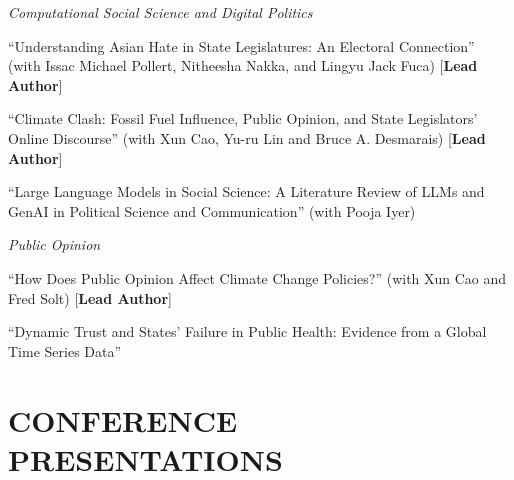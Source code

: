 \documentclass[10.5pt,]{article}
\providecommand{\tightlist}{%
	\setlength{\itemsep}{0pt}\setlength{\parskip}{0pt}}
\renewenvironment{itemize}{
	\begin{list}{}{
			\setlength{\leftmargin}{1.5em}
		}
	}{
	\end{list}
}
\begin{document}
\begin{itemize}
  \begin{itemize}
  \tightlist
  \item
    \emph{Computational Social Science and Digital Politics}
  \item
    ``Understanding Asian Hate in State Legislatures: An Electoral
    Connection'' (with Issac Michael Pollert, Nitheesha Nakka, and
    Lingyu Jack Fuca) {[}\textbf{Lead Author}{]}
  \item
    ``Climate Clash: Fossil Fuel Influence, Public Opinion, and State
    Legislators' Online Discourse'' (with Xun Cao, Yu-ru Lin and Bruce
    A. Desmarais) {[}\textbf{Lead Author}{]}
  \item
    ``Large Language Models in Social Science: A Literature Review of
    LLMs and GenAI in Political Science and Communication'' (with Pooja
    Iyer)
  \item
    \emph{Public Opinion}
  \item
    ``How Does Public Opinion Affect Climate Change Policies?'' (with
    Xun Cao and Fred Solt) {[}\textbf{Lead Author}{]}
  \item
    ``Dynamic Trust and States' Failure in Public Health: Evidence from
    a Global Time Series Data''
  \end{itemize}
\end{itemize}

\section{CONFERENCE PRESENTATIONS}\label{conference-presentations}
\end{document}
